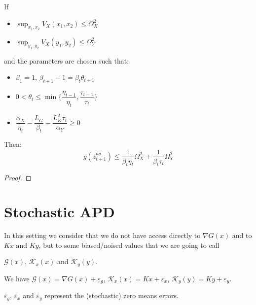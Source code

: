 \documentclass[10pt]{article}
\begin{document}
\begin{thm}


If

\begin{itemize}
\item $\sup_{x_{1},x_{2}} V_{X}(x_{1},x_{2}) \leq \Omega_{X}^{2}$
\item $\sup_{y_{1},y_{2}} V_{X}(y_{1},y_{2}) \leq \Omega_{Y}^{2}$
\end{itemize}

and the parameters are chosen such that:

\begin{itemize}
\item $\beta_{1} = 1$, $\beta_{t+1} - 1 = \beta_{t}\theta_{t+1}$
\item $0 < \theta_{t} \leq \min\{ \dfrac{\eta_{t-1}}{\eta_{t}}, \dfrac{\tau_{t-1}}{\tau_{t}}\}$
\item $\dfrac{\alpha_{X}}{\eta_{t}} - \dfrac{L_{G}}{\beta_{t}} - \dfrac{L_{K}^{2}\tau_{t}}{\alpha_{Y}} \geq 0$
\end{itemize}

Then:
$$
g(z_{t+1}^{ag}) \leq \dfrac{1}{\beta_{t}\eta_{t}}\Omega_{X}^{2} + \dfrac{1}{\beta_{t}\tau_{t}}\Omega_{Y}^{2}
$$


\end{thm}

\begin{proof}

\end{proof}

\section{Stochastic APD}

In this setting we consider that we do not have access directly to $\nabla G(x)$ and to $Kx$ and $Ky$, but to some biased/noised values that we are going to call

$\mathcal{G}(x)$, $\mathcal{K}_{x}(x)$ and $\mathcal{K}_{y}(y)$.

We have $\mathcal{G}(x) = \nabla G(x) + \varepsilon_{g}$, $\mathcal{K}_{x}(x) = Kx + \varepsilon_{x}$, $\mathcal{K}_{y}(y) = Ky + \varepsilon_{y}$.

$\varepsilon_{g}$, $\varepsilon_{x}$ and $\varepsilon_{y}$ represent the (stochastic) zero means errors.
\end{document}
